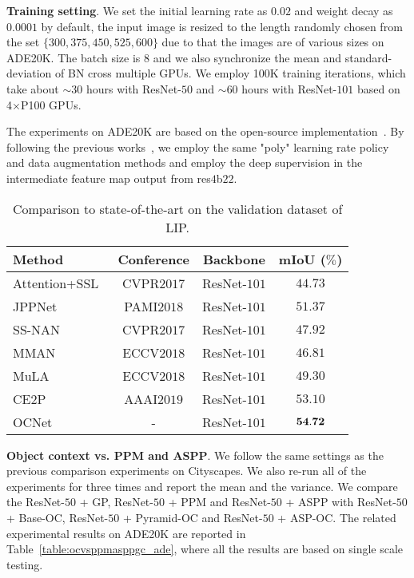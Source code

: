 \documentclass[10pt,twocolumn,letterpaper]{article}
\begin{document}
\vspace{.1cm}
\noindent\textbf{Training setting}.
We set the initial learning rate as $0.02$ and weight decay as $0.0001$ by default, the input image is resized to the length randomly chosen from the set $\{300,375,450,525,600\}$ due to that the images are of various sizes on ADE20K. The batch size is 8 and we also synchronize the mean and standard-deviation of BN cross multiple GPUs. We employ 100K training iterations, which take about $\sim30$ hours with ResNet-$50$ and $\sim60$ hours with ResNet-$101$ based on 4$\times$P100 GPUs.

The experiments on ADE20K are based on the open-source implementation~\cite{zhou2017scene}.
By following the previous works~\cite{zhao2017pyramid,chen2017rethinking}, we employ the same "poly" learning rate policy and data augmentation methods and employ the deep supervision in the intermediate feature map output from res$4$b$22$.

\begin{table}[htb]
\centering
\footnotesize
\caption{\small{Comparison to state-of-the-art on the validation dataset of LIP.}}
\begin{tabular}{l|c|c|c} \hline
Method & Conference & Backbone & mIoU ($\%$)  \\
\hline
Attention+SSL~\cite{Gong_2017_CVPR} &  CVPR$2017$  & ResNet-$101$  &  $44.73$\\
JPPNet~\cite{liang2018look}         &  PAMI$2018$  & ResNet-$101$  &  $51.37$ \\
SS-NAN~\cite{zhao2017self}       &  CVPR$2017$  & ResNet-$101$  &  $47.92$ \\
MMAN~\cite{luo2018macro} &  ECCV$2018$   & ResNet-$101$  &  $46.81$ \\
MuLA~\cite{nie2018mutual} &  ECCV$2018$  & ResNet-$101$  &  $49.30$ \\
CE2P~\cite{liu2018devil}  &  AAAI$2019$     & ResNet-$101$  &  \underline{$53.10$} \\
OCNet & - &  ResNet-$101$ & $\bf{54.72}$ \\
\hline
\end{tabular}
\label{table:ocnet_sota_exp_lip}
\end{table}

\vspace{0.1cm}
\noindent\textbf{Object context vs. PPM and ASPP}.
We follow the same settings as the previous comparison experiments on Cityscapes.
We also re-run all of the experiments for three times and  report the mean and the variance.
We compare the ResNet-$50$ + GP, ResNet-$50$ + PPM and ResNet-$50$ + ASPP with ResNet-$50$ + Base-OC, ResNet-$50$ + Pyramid-OC and ResNet-$50$ + ASP-OC. The related experimental results on ADE20K are reported in Table~\ref{table:ocvsppmasppgc_ade}, where all the results are based on single scale testing.
\end{document}
